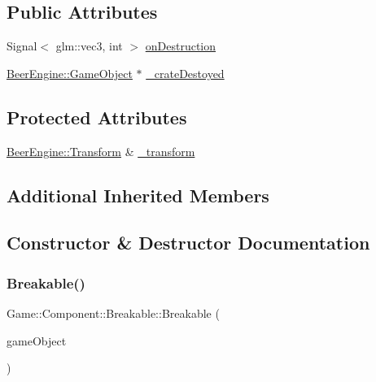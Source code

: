 \subsection*{Public Attributes}
\begin{DoxyCompactItemize}
\item 
Signal$<$ glm\+::vec3, int $>$ \mbox{\hyperlink{class_game_1_1_component_1_1_breakable_ac0ae61567c2ac3615929e42bdb0ed735}{on\+Destruction}}
\item 
\mbox{\hyperlink{class_beer_engine_1_1_game_object}{Beer\+Engine\+::\+Game\+Object}} $\ast$ \mbox{\hyperlink{class_game_1_1_component_1_1_breakable_a1bead819f5f60d1bf354b80cf899853f}{\+\_\+crate\+Destoyed}}
\end{DoxyCompactItemize}
\subsection*{Protected Attributes}
\begin{DoxyCompactItemize}
\item 
\mbox{\hyperlink{class_beer_engine_1_1_transform}{Beer\+Engine\+::\+Transform}} \& \mbox{\hyperlink{class_game_1_1_component_1_1_breakable_a97c7499afa143aa9493c206adcb5eee0}{\+\_\+transform}}
\end{DoxyCompactItemize}
\subsection*{Additional Inherited Members}


\subsection{Constructor \& Destructor Documentation}
\mbox{\label{class_game_1_1_component_1_1_breakable_ad739d120313be059576347fd7c691173}} 
\subsubsection{\texorpdfstring{Breakable()}{Breakable()}}
{\footnotesize\ttfamily Game\+::\+Component\+::\+Breakable\+::\+Breakable (\begin{DoxyParamCaption}\item[{\mbox{\hyperlink{class_beer_engine_1_1_game_object}{Beer\+Engine\+::\+Game\+Object}} $\ast$}]{game\+Object }\end{DoxyParamCaption})}

